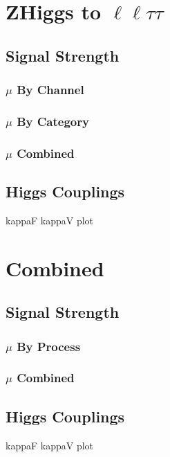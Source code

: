 \section{ZHiggs to $\ell\ell\tau\tau$}

\subsection{Signal Strength}
\subsubsection{$\mu$ By Channel}
\subsubsection{$\mu$ By Category}
\subsubsection{$\mu$ Combined}
\subsection{Higgs Couplings}
kappaF kappaV plot

\section{Combined}

\subsection{Signal Strength}
\subsubsection{$\mu$ By Process}
\subsubsection{$\mu$ Combined}
\subsection{Higgs Couplings}
kappaF kappaV plot

